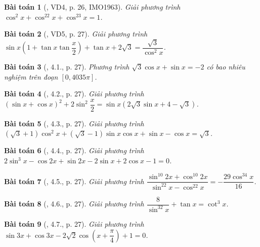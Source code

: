 \documentclass{article}
\newtheorem{baitoan}{Bài toán}
\begin{document}
\begin{baitoan}[\cite{Hung_nang_cao_phat_trien_Toan_11_tap_1}, VD4, p. 26, IMO1963]
	Giải phương trình $\cos^2x + \cos^22x + \cos^23x = 1$.
\end{baitoan}

\begin{baitoan}[\cite{Hung_nang_cao_phat_trien_Toan_11_tap_1}, VD5, p. 27]
	Giải phương trình $\sin x\left(1 + \tan x\tan\dfrac{x}{2}\right) + \tan x + 2\sqrt{3} = \dfrac{\sqrt{3}}{\cos^2x}$.
\end{baitoan}

\begin{baitoan}[\cite{Hung_nang_cao_phat_trien_Toan_11_tap_1}, 4.1., p. 27]
	Phương trình $\sqrt{3}\cos x + \sin x = -2$ có bao nhiêu nghiệm trên đoạn $[0,4035\pi]$.
\end{baitoan}

\begin{baitoan}[\cite{Hung_nang_cao_phat_trien_Toan_11_tap_1}, 4.2., p. 27]
	Giải phương trình $(\sin x + \cos x)^2 + 2\sin^2\dfrac{x}{2} = \sin x(2\sqrt{3}\sin x + 4 - \sqrt{3})$.
\end{baitoan}

\begin{baitoan}[\cite{Hung_nang_cao_phat_trien_Toan_11_tap_1}, 4.3., p. 27]
	Giải phương trình $(\sqrt{3} + 1)\cos^2x + (\sqrt{3} - 1)\sin x\cos x + \sin x - \cos x = \sqrt{3}$.
\end{baitoan}

\begin{baitoan}[\cite{Hung_nang_cao_phat_trien_Toan_11_tap_1}, 4.4., p. 27]
	Giải phương trình $2\sin^3x - \cos2x + \sin2x - 2\sin x + 2\cos x - 1 = 0$.
\end{baitoan}

\begin{baitoan}[\cite{Hung_nang_cao_phat_trien_Toan_11_tap_1}, 4.5., p. 27]
	Giải phương trình $\dfrac{\sin^{10}2x + \cos^{10}2x}{\sin^22x - \cos^22x} = -\dfrac{29\cos^34x}{16}$.
\end{baitoan}

\begin{baitoan}[\cite{Hung_nang_cao_phat_trien_Toan_11_tap_1}, 4.6., p. 27]
	Giải phương trình $\dfrac{8}{\sin^32x} + \tan x = \cot^3x$.
\end{baitoan}

\begin{baitoan}[\cite{Hung_nang_cao_phat_trien_Toan_11_tap_1}, 4.7., p. 27]
	Giải phương trình $\sin3x + \cos3x - 2\sqrt{2}\cos\left(x + \dfrac{\pi}{4}\right) + 1 = 0$.
\end{baitoan}
\end{document}
